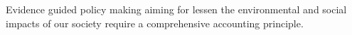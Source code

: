 Evidence guided policy making aiming for lessen the environmental and social
impacts of our society require a comprehensive accounting principle.
